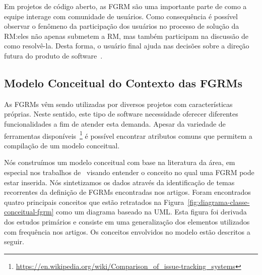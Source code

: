 Em projetos de código aberto, as FGRM são uma importante parte de como a equipe
interage com comunidade de usuários. Como consequência é possível observar o
fenômeno da participação dos usuários no processo de solução da RM:\@ eles não
apenas submetem a RM, mas também participam na discussão de como resolvê-la.
Desta forma, o usuário final ajuda nas decisões sobre a direção futura do
produto de software~\cite{breu2010information}.

\subsection{Modelo Conceitual do Contexto das FGRMs}
\label{sub:espectro_funcionalidades_fgrm}

As FGRMs vêm sendo utilizadas por diversos projetos com características
próprias. Neste sentido, este tipo de software necessidade oferecer diferentes
funcionalidades a fim de atender esta demanda. Apesar da variedade de
ferramentas
disponíveis~\footnote{\url{https://en.wikipedia.org/wiki/Comparison_of_issue-tracking_systems}}
é possível encontrar atributos comuns que permitem a compilação de um modelo
conceitual.

Nós construímos um modelo conceitual com base na literatura da área, em especial
nos trabalhos de~\cite{cavalcanti2014challenges, singh2011bug,
	kshirsagar2015issue} visando entender o conceito no qual uma FGRM pode estar
inserida. Nós sintetizamos os dados através da identificação de temas
recorrentes da definição de FGRMs encontradas nos artigos. Foram encontrados
quatro principais conceitos que estão retratados na
Figura~\ref{fig:diagrama-classe-conceitual-fgrm} como um diagrama baseado na
UML\@. Esta figura foi derivada dos estudos primários e consiste em uma
generalização dos elementos utilizados com frequência nos artigos. Os conceitos
envolvidos no modelo estão descritos a seguir.


